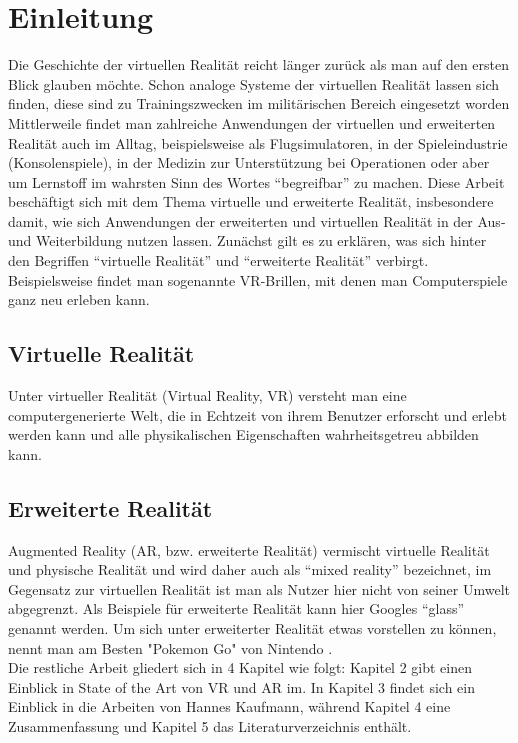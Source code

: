 \documentclass[deutsch]{llncs}
\begin{document}
\tableofcontents
\newpage




\section{Einleitung}

\label{sec:intro}
\cite{1667626}
Die Geschichte der virtuellen Realität reicht länger zurück als man auf den ersten Blick glauben möchte. Schon analoge Systeme der virtuellen Realität lassen sich finden, diese sind zu Trainingszwecken im militärischen Bereich eingesetzt worden \cite{VR-Nerds}
Mittlerweile findet man zahlreiche Anwendungen der virtuellen und erweiterten Realität auch im Alltag, beispielsweise als Flugsimulatoren, in der Spieleindustrie (Konsolenspiele), in der Medizin zur Unterstützung bei Operationen oder aber um Lernstoff im wahrsten Sinn des Wortes ``begreifbar'' zu machen. 
Diese Arbeit beschäftigt sich mit dem Thema virtuelle und erweiterte Realität, insbesondere damit, wie sich Anwendungen der erweiterten und virtuellen Realität in der Aus- und Weiterbildung nutzen lassen. 
Zunächst gilt es zu erklären, was sich hinter den Begriffen ``virtuelle Realität'' und ``erweiterte Realität'' verbirgt. 
Beispielsweise findet man sogenannte VR-Brillen, mit denen man Computerspiele ganz neu erleben kann.

\subsection{Virtuelle Realität}
\label{sec:typo}
Unter virtueller Realität (Virtual Reality, VR) versteht man eine computergenerierte Welt, die in Echtzeit von ihrem Benutzer erforscht und erlebt werden kann und alle physikalischen Eigenschaften wahrheitsgetreu abbilden kann. 
\subsection{Erweiterte Realität}

Augmented Reality (AR, bzw. erweiterte Realität) vermischt virtuelle Realität und physische Realität und wird daher auch als ``mixed reality'' bezeichnet, im Gegensatz zur virtuellen Realität ist man als Nutzer hier nicht von seiner Umwelt abgegrenzt.
Als Beispiele für erweiterte Realität kann hier Googles ``glass'' genannt werden. 
Um sich unter erweiterter Realität etwas vorstellen zu können, nennt man am Besten "Pokemon Go"  von Nintendo \cite{Klampfer}.
\noindent \\
Die restliche Arbeit gliedert sich in 4 Kapitel wie folgt: 
Kapitel 2 gibt einen Einblick in State of the Art von VR und AR im. In Kapitel 3 findet sich ein Einblick in die Arbeiten von Hannes Kaufmann, während Kapitel 4 eine Zusammenfassung und Kapitel 5 das Literaturverzeichnis enthält.
\end{document}
